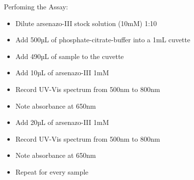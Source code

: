 Perfoming the Assay:
\begin{itemize}
    \item Dilute arsenazo-III stock solution (10mM) 1:10
    \item Add 500µL of phosphate-citrate-buffer into a 1mL cuvette
    \item Add 490µL of sample to the cuvette
    \item Add 10µL of arsenazo-III 1mM
    \item Record UV-Vis spectrum from 500nm to 800nm
    \item Note absorbance at 650nm
    \item Add 20µL of arsenazo-III 1mM
    \item Record UV-Vis spectrum from 500nm to 800nm
    \item Note absorbance at 650nm
    \item Repeat for every sample
\end{itemize}